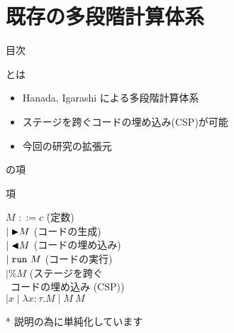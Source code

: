 \documentclass[dvipdfmx,aspectratio=169, 20pt]{beamer}
\begin{document}
\section{既存の多段階計算体系 \LTP}

\begin{frame}{目次}
    \tableofcontents[currentsection]
\end{frame}


\begin{frame}[fragile]{\LTP とは}
    \begin{itemize}
        \item Hanada, Igarashi による多段階計算体系
        \item ステージを跨ぐコードの埋め込み(CSP)が可能
        \item 今回の研究の拡張元
    \end{itemize}
\end{frame}

\begin{frame}[fragile]{\LTP の項}
    \begin{block}{項}
        \begin{tabbing}
            \hspace{5mm} \( M \) \= \( ::= c \) \hspace{20mm} \= (定数) \\
            \> \( \mid {\mathop{\blacktriangleright}} M \) \> (コードの生成) \\
            \> \( \mid {\mathop{\blacktriangleleft}} M \) \> (コードの埋め込み) \\
            \> \( \mid \verb|run|\ M \) \> (コードの実行) \\
            \> \( \mid \% M \) \> (ステージを跨ぐ \\
            \> \> \ コードの埋め込み (CSP)) \\
            \> \( \mid x \mid \lambda x:\tau.M \mid M\ M \)
        \end{tabbing}
    \end{block}
    * 説明の為に単純化しています
\end{frame}
\end{document}
